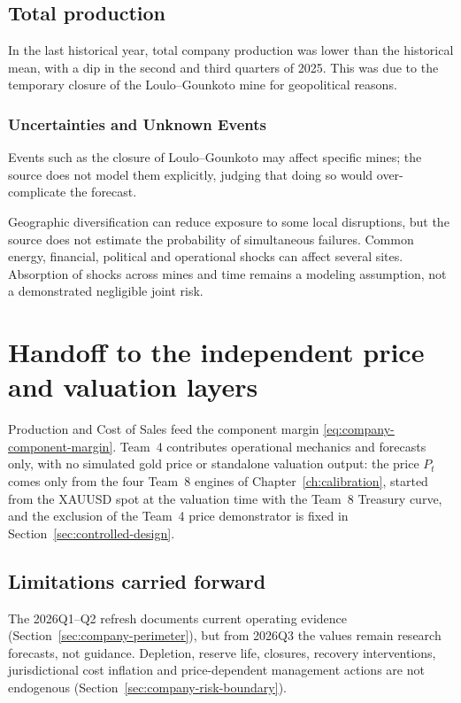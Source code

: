 \subsection{Total production}
In the last historical year, total company production was lower than the historical mean, with a dip in the second and third quarters of 2025. This was due to the temporary closure of the Loulo--Gounkoto mine for geopolitical reasons.



\subsubsection{Uncertainties and Unknown Events}
Events such as the closure of Loulo--Gounkoto may affect specific mines; the source does not model them explicitly, judging that doing so would over-complicate the forecast.

Geographic diversification can reduce exposure to some local disruptions, but the source does not estimate the probability of simultaneous failures. Common energy, financial, political and operational shocks can affect several sites. Absorption of shocks across mines and time remains a modeling assumption, not a demonstrated negligible joint risk.

\section{Handoff to the independent price and valuation layers}

Production and Cost of Sales feed the component margin
\eqref{eq:company-component-margin}. Team~4 contributes operational mechanics
and forecasts only, with no simulated gold price or standalone valuation
output: the price \(P_t\) comes only from the four Team~8 engines of
Chapter~\ref{ch:calibration}, started from the XAUUSD spot at the valuation
time with the Team~8 Treasury curve, and the exclusion of the Team~4 price
demonstrator is fixed in Section~\ref{sec:controlled-design}.

\subsection{Limitations carried forward}

The 2026Q1--Q2 refresh documents current operating evidence
(Section~\ref{sec:company-perimeter}), but from 2026Q3 the values remain
research forecasts, not guidance. Depletion, reserve life, closures, recovery
interventions, jurisdictional cost inflation and price-dependent management
actions are not endogenous (Section~\ref{sec:company-risk-boundary}).
